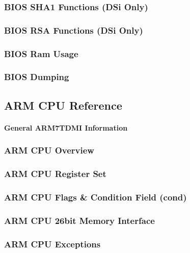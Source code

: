 \documentclass[11pt,a4paper]{proc}
\begin{document}
\begin{flushleft}
\subsubsection{BIOS SHA1 Functions (DSi Only)}

\subsubsection{BIOS RSA Functions (DSi Only)}

\subsubsection{BIOS Ram Usage}

\subsubsection{BIOS Dumping}

\subsection{ARM CPU Reference}

\paragraph{General ARM7TDMI Information}

\subsubsection{ARM CPU Overview}

\subsubsection{ARM CPU Register Set}

\subsubsection{ARM CPU Flags \& Condition Field (cond)}

\subsubsection{ARM CPU 26bit Memory Interface}

\subsubsection{ARM CPU Exceptions}


\end{flushleft}
\end{document}
